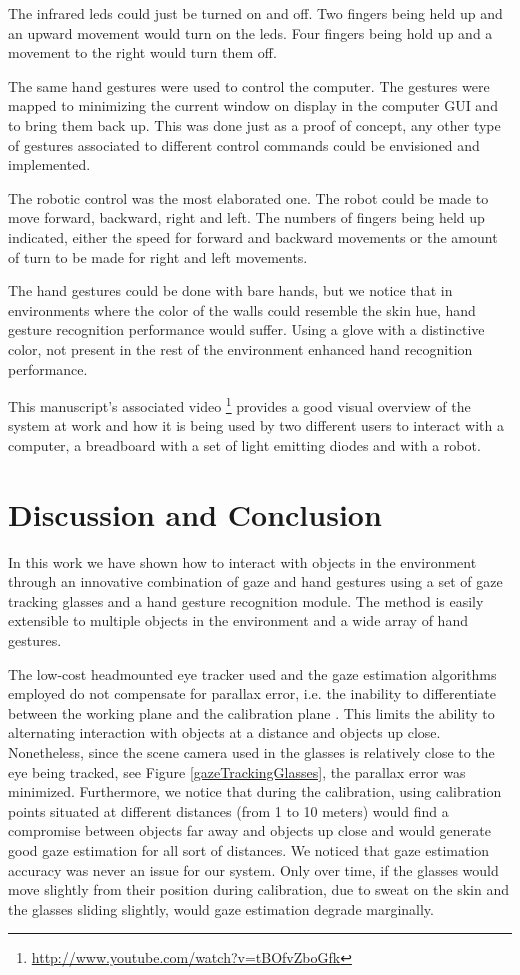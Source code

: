 \documentclass[jou,a4paper,notxfonts]{apa}
\begin{document}
The infrared leds could just be turned on and off. Two fingers being held up and an upward movement would turn on the
leds. Four fingers being hold up and a movement to the right would turn them off.

The same hand gestures were used to control the computer. The gestures were mapped to minimizing the current window on
display in the computer GUI and to bring them back up. This was done just as a proof of concept, any other type of
gestures associated to different control commands could be envisioned and implemented.

The robotic control was the most elaborated one. The robot could be made to move forward, backward, right and left. The
numbers of fingers being held up indicated, either the speed for forward and backward movements or the amount of turn to
be made for right and left movements.

The hand gestures could be done with bare hands, but we notice that in environments where the color of the walls could
resemble the skin hue, hand gesture recognition performance would suffer. Using a glove with a distinctive color, not 
present in the rest of the environment enhanced hand recognition performance.

This manuscript's associated video \footnote{\url{http://www.youtube.com/watch?v=tBOfvZboGfk}} provides a good visual
overview of the system at work and how it is being used by two different users to interact with a computer, a breadboard
with a set of light emitting diodes and with a robot.


\section{Discussion and Conclusion}
In this work we have shown how to interact with objects in the environment through an innovative combination of gaze and
hand gestures using a set of gaze tracking glasses and a hand gesture recognition module. The method is easily
extensible to multiple objects in the environment and a wide array of hand gestures.

The low-cost headmounted eye tracker used and the gaze estimation algorithms employed do not compensate for parallax
error, i.e. the inability to differentiate between the working plane and the calibration plane
\cite{mardanbegi2012parallax}. This limits the ability to alternating interaction with objects at a distance and objects
up close. Nonetheless, since the scene camera used in the glasses is relatively close to the eye being tracked, see Figure
\ref{gazeTrackingGlasses}, the parallax error was minimized. Furthermore, we notice that during the calibration, using
calibration points situated at different distances (from 1 to 10 meters) would find a compromise between objects
far away and objects up close and would generate good gaze estimation for all sort of distances. We noticed that
gaze estimation accuracy was never an issue for our system. Only over time, if the glasses would move slightly from
their position during calibration, due to sweat on the skin and the glasses sliding slightly, would gaze
estimation degrade marginally.
\end{document}
